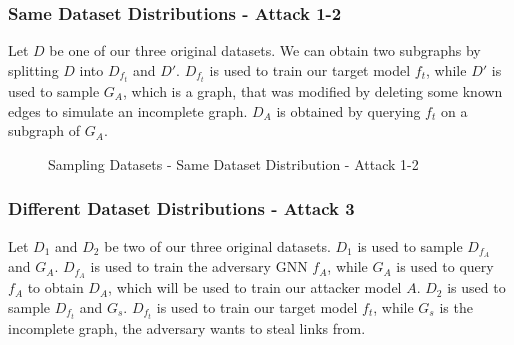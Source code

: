       \subsubsection*{Same Dataset Distributions - Attack 1-2}
        Let $D$ be one of our three original datasets.
        We can obtain two subgraphs by splitting $D$ into $D_{f_t}$ and $D'$.
        $D_{f_t}$ is used to train our target model $f_t$, while $D'$ is used to sample $G_{A}$, which is a graph, that was modified by deleting some known edges to simulate an incomplete graph.
        $D_A$ is obtained by querying $f_t$ on a subgraph of $G_A$. 

        \vspace{0.48cm}
        \begin{figure}[h!]
          \begin{center}
          \end{center}
          \caption{Sampling Datasets - Same Dataset Distribution - Attack 1-2}
          \label{figure:sample-datasets-attack1-2}
        \end{figure}

      \subsubsection*{Different Dataset Distributions - Attack 3}
        Let $D_1$ and $D_2$ be two of our three original datasets.
        $D_1$ is used to sample $D_{f_A}$ and $G_A$.
        $D_{f_A}$ is used to train the adversary GNN $f_A$, while $G_A$ is used to query $f_A$ to obtain $D_A$, which will be used to train our attacker model $A$.
        $D_2$ is used to sample $D_{f_t}$ and $G_s$.
        $D_{f_t}$ is used to train our target model $f_t$, while $G_s$ is the incomplete graph, the adversary wants to steal links from.

